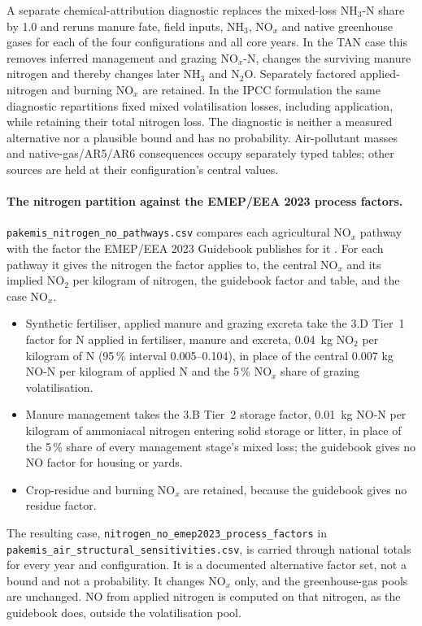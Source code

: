 \documentclass[essd]{copernicus}
\begin{document}
A separate chemical-attribution diagnostic replaces the mixed-loss NH$_3$-N share by 1.0 and reruns manure fate, field inputs, NH$_3$, NO$_x$ and native greenhouse gases for each of the four configurations and all core years. In the TAN case this removes inferred management and grazing NO$_x$-N, changes the surviving manure nitrogen and thereby changes later NH$_3$ and N$_2$O. Separately factored applied-nitrogen and burning NO$_x$ are retained. In the IPCC formulation the same diagnostic repartitions fixed mixed volatilisation losses, including application, while retaining their total nitrogen loss. The diagnostic is neither a measured alternative nor a plausible bound and has no probability. Air-pollutant masses and native-gas/AR5/AR6 consequences occupy separately typed tables; other sources are held at their configuration's central values.

\paragraph{The nitrogen partition against the EMEP/EEA 2023 process factors.} \texttt{pakemis\_\allowbreak nitrogen\_\allowbreak no\_\allowbreak pathways.\allowbreak csv} compares each agricultural NO$_x$ pathway with the factor the EMEP/EEA 2023 Guidebook publishes for it \citep{EMEPEEA2023}. For each pathway it gives the nitrogen the factor applies to, the central NO$_x$ and its implied NO$_2$ per kilogram of nitrogen, the guidebook factor and table, and the case NO$_x$.
\begin{itemize}
\item Synthetic fertiliser, applied manure and grazing excreta take the 3.D Tier~1 factor for N applied in fertiliser, manure and excreta, \SI{0.04}{\kilo\gram} NO$_2$ per kilogram of N (95\,\% interval 0.005--0.104), in place of the central 0.007 kg NO-N per kilogram of applied N and the 5\,\% NO$_x$ share of grazing volatilisation.
\item Manure management takes the 3.B Tier~2 storage factor, \SI{0.01}{\kilo\gram} NO-N per kilogram of ammoniacal nitrogen entering solid storage or litter, in place of the 5\,\% share of every management stage's mixed loss; the guidebook gives no NO factor for housing or yards.
\item Crop-residue and burning NO$_x$ are retained, because the guidebook gives no residue factor.
\end{itemize}
The resulting case, \texttt{nitrogen\_no\_emep2023\_process\_factors} in \texttt{pakemis\_air\_structural\_sensitivities.csv}, is carried through national totals for every year and configuration. It is a documented alternative factor set, not a bound and not a probability. It changes NO$_x$ only, and the greenhouse-gas pools are unchanged. NO from applied nitrogen is computed on that nitrogen, as the guidebook does, outside the volatilisation pool.
\end{document}
